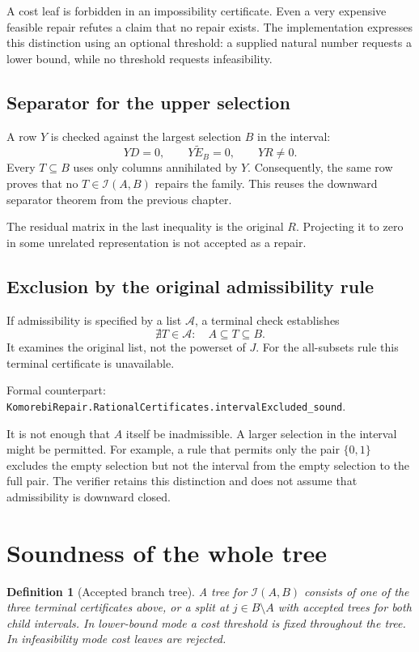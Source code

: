 \documentclass[11pt,letterpaper,oneside,openany]{book}
\theoremstyle{quiet}
\newtheorem{definition}[theorem]{Definition}
\newcommand{\formal}[1]{\par\nobreak\begingroup\footnotesize\color{Slate}\sffamily Formal counterpart: \normalfont\nolinkurl{#1}.\par\endgroup}
\begin{document}
A cost leaf is forbidden in an impossibility certificate. Even a very expensive feasible repair refutes a claim that no repair exists. The implementation expresses this distinction using an optional threshold: a supplied natural number requests a lower bound, while no threshold requests infeasibility.

\subsection{Separator for the upper selection}

A row $Y$ is checked against the largest selection $B$ in the interval:
\[
 YD=0,\qquad Y\widetilde E_B=0,\qquad YR\ne0.
\]
Every $T\subseteq B$ uses only columns annihilated by $Y$. Consequently, the same row proves that no $T\in\mathcal I(A,B)$ repairs the family. This reuses the downward separator theorem from the previous chapter.

The residual matrix in the last inequality is the original $R$. Projecting it to zero in some unrelated representation is not accepted as a repair.

\subsection{Exclusion by the original admissibility rule}

If admissibility is specified by a list $\mathcal A$, a terminal check establishes
\[
 \nexists T\in\mathcal A:\quad A\subseteq T\subseteq B.
\]
It examines the original list, not the powerset of $J$. For the all-subsets rule this terminal certificate is unavailable.
\formal{KomorebiRepair.RationalCertificates.intervalExcluded_sound}

It is not enough that $A$ itself be inadmissible. A larger selection in the interval might be permitted. For example, a rule that permits only the pair $\{0,1\}$ excludes the empty selection but not the interval from the empty selection to the full pair. The verifier retains this distinction and does not assume that admissibility is downward closed.

\section{Soundness of the whole tree}

\begin{definition}[Accepted branch tree]
A tree for $\mathcal I(A,B)$ consists of one of the three terminal certificates above, or a split at $j\in B\setminus A$ with accepted trees for both child intervals. In lower-bound mode a cost threshold is fixed throughout the tree. In infeasibility mode cost leaves are rejected.
\end{definition}
\end{document}
